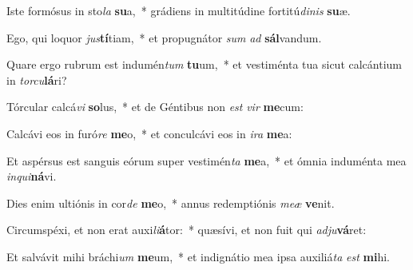 \item Iste formósus in sto\textit{la} \textbf{su}a,~* grádiens in multitúdine fortitú\textit{di}\textit{nis} \textbf{su}æ.
\item Ego, qui loquor \textit{jus}\textbf{tí}tiam,~* et propugnátor \textit{sum} \textit{ad} \textbf{sál}vandum.
\item Quare ergo rubrum est indumén\textit{tum} \textbf{tu}um,~* et vestiménta tua sicut calcántium in \textit{tor}\textit{cu}\textbf{lá}ri?
\item Tórcular calcá\textit{vi} \textbf{so}lus,~* et de Géntibus non \textit{est} \textit{vir} \textbf{me}cum:
\item Calcávi eos in furó\textit{re} \textbf{me}o,~* et conculcávi eos in \textit{i}\textit{ra} \textbf{me}a:
\item Et aspérsus est sanguis eórum super vestimén\textit{ta} \textbf{me}a,~* et ómnia induménta mea \textit{in}\textit{qui}\textbf{ná}vi.
\item Dies enim ultiónis in cor\textit{de} \textbf{me}o,~* annus redemptiónis \textit{me}\textit{æ} \textbf{ve}nit.
\item Circumspéxi, et non erat auxi\textit{li}\textbf{á}tor:~* quæsívi, et non fuit qui \textit{ad}\textit{ju}\textbf{vá}ret:
\item Et salvávit mihi bráchi\textit{um} \textbf{me}um,~* et indignátio mea ipsa auxiliá\textit{ta} \textit{est} \textbf{mi}hi.
